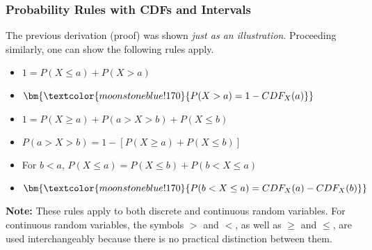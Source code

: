 \documentclass[handout]{beamer} %
\begin{document}
\begin{frame}
\frametitle{Probability Rules with CDFs and Intervals}

The previous derivation (proof) was shown \emph{just as an illustration}. Proceeding similarly, one can show the following rules apply.
\vspace{0.8em}
  \pause

\begin{itemize}
    \setlength{\itemsep}{5pt} %
  \item \( 1 = P(X \leq a) + P(X > a) \)
  \item \( \bm{\textcolor{moonstoneblue!170}{P(X > a) = 1 - CDF_X(a)}} \)
  \item \( 1 = P(X \geq  a) + P(a > X > b) + P(X \leq b) \)
  \item \( P(a > X > b) = 1 - [P(X \geq a) + P(X \leq b)] \)
  \item For $b<a$, \( P(X \leq  a) = P(X \leq  b) + P(b < X \leq  a) \)
  \item \(   \bm{\textcolor{moonstoneblue!170}{P(b < X \leq  a) = CDF_X(a) - CDF_X(b)}} \)
\end{itemize}
\vspace{0.7em}
  \pause
\footnotesize
\textbf{Note:} These rules apply to both discrete and continuous random variables. \textcolor{moonstoneblue!170}{For continuous random variables, the symbols \(>\) and \(<\), as well as \(\geq\) and \(\leq\), are used interchangeably because there is no practical distinction between them}.

\end{frame}
\end{document}
